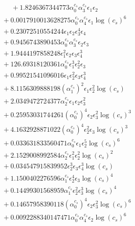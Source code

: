 \documentclass[10pt]{article}
\begin{document}
\begin{align*}
\phantom{F_{s,7}} &\phantom{={}}{}  + 1.8246367344773 \alpha_{0}^{c_s} \alpha_{3}^{c_s} \epsilon_{1} \epsilon_{2} \\
&{}  + 0.0017910013628275 \alpha_{0}^{c_s} \alpha_{4}^{c_s} \epsilon_{1} \log{\left(c_{s} \right)}^{6} \\
&{}  + 0.23072510554244 \epsilon_{1} \epsilon_{2} \epsilon_{3}^{4} \epsilon_{4} \\
&{}  + 0.9456743890453 \alpha_{0}^{c_s} \alpha_{3}^{c_s} \epsilon_{2} \epsilon_{3} \\
&{}  + 1.9444197858248 \epsilon_{1}^{2} \epsilon_{2} \epsilon_{3} \epsilon_{4}^{3} \\
&{}  + 126.69318120361 \alpha_{0}^{c_s} \epsilon_{1}^{3} \epsilon_{2}^{2} \epsilon_{3} \\
&{}  + 0.99521541096016 \epsilon_{1} \epsilon_{2}^{2} \epsilon_{3} \epsilon_{4}^{3} \\
&{}  + 8.1156309888198 \left(\alpha_{1}^{c_s}\right)^{2} \epsilon_{1} \epsilon_{2}^{2} \log{\left(c_{s} \right)} \\
&{}  + 2.0349472724377 \alpha_{2}^{c_s} \epsilon_{1} \epsilon_{2} \epsilon_{3}^{2} \\
&{}  + 0.25953031744261 \left(\alpha_{0}^{c_s}\right)^{4} \epsilon_{2} \epsilon_{3}^{2} \log{\left(c_{s} \right)}^{3} \\
&{}  + 4.1632928871022 \left(\alpha_{0}^{c_s}\right)^{4} \epsilon_{2}^{2} \epsilon_{3} \log{\left(c_{s} \right)}^{3} \\
&{}  + 0.033631833560471 \alpha_{0}^{c_s} \epsilon_{1} \epsilon_{2}^{5} \log{\left(c_{s} \right)}^{6} \\
&{}  + 2.1529008992584 \alpha_{2}^{c_s} \epsilon_{1}^{2} \epsilon_{2}^{2} \log{\left(c_{s} \right)}^{2} \\
&{}  + 0.034547915839952 \epsilon_{2}^{3} \epsilon_{3} \epsilon_{4}^{3} \log{\left(c_{s} \right)} \\
&{}  + 1.1500402276596 \alpha_{1}^{c_s} \epsilon_{2}^{4} \epsilon_{3} \log{\left(c_{s} \right)}^{4} \\
&{}  + 0.14499301568959 \alpha_{1}^{c_s} \epsilon_{2}^{2} \epsilon_{3}^{3} \log{\left(c_{s} \right)}^{4} \\
&{}  + 0.14657958390118 \left(\alpha_{0}^{c_s}\right)^{4} \epsilon_{2} \epsilon_{3}^{2} \log{\left(c_{s} \right)}^{6} \\
&{}  + 0.0092288340147471 \alpha_{0}^{c_s} \alpha_{4}^{c_s} \epsilon_{2} \log{\left(c_{s} \right)}^{6} \\

\end{align*}
\end{document}
